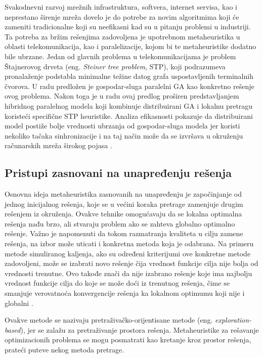 \documentclass[a4paper]{article}
\begin{document}
Svakodnevni razvoj mrežnih infrastruktura, softvera, internet servisa, kao i neprestano širenje mreža dovelo je do potrebe za novim algoritmima koji će zameniti tradicionalne koji su neefikasni kad su u pitanju problemi u industriji. Ta potreba za bržim rešenjima zadovoljena je upotrebnom metaheuristika u oblasti telekomunikacija, kao i paralelizacije, kojom bi te metaheuristike dodatno bile ubrzane. Jedan od glavnih problema u telekomunikacijama je problem Štajnerovog drveta (eng. \textit{Steiner tree problem}, STP), koji podrazumeva pronalaženje podstabla minimalne težine datog grafa uspostavljenih terminalnih čvorova. U radu \cite{fatta} predložen je gospodar-sluga paralelni GA kao konkretno rešenje ovog problema. Nakon toga je u radu \cite{martins} ovaj predlog proširen predstavljanjem hibridnog paralelnog modela koji kombinuje distribuirani GA i lokalnu pretragu koristeći specifične STP heuristike. Analiza efikasnosti pokazuje da distribuirani model postiže bolje vrednosti ubrzanja od gospodar-sluga modela jer koristi nekoliko tačaka sinhronizacije i na taj način može da se izvršava u okruženju računarskih mreža širokog pojasa \cite{alba}.

\subsection{Pristupi zasnovani na unapređenju rešenja}
\label{sec:ParalelizacijaJednog}

Osnovna ideja metaheuristika zasnovanih na unapređenju je započinjanje od jednog inicijalnog rešenja, koje se u većini koraka pretrage zamenjuje drugim rešenjem iz okruženja. Ovakve tehnike omogućavaju da se lokalna optimalna rešenja nađu brzo, ali stvaraju problem ako se zahteva globalno optimalno rešenje. Važno je napomenuti da tokom razmatranja kvaliteta u cilju zamene rešenja, na izbor može uticati i konkretna metoda koja je odabrana.
Na primeru metode simuliranog kaljenja, ako su određeni kriterijumi ove konkretne metode zadovoljeni, može se izabrati novo rešenje čija vrednost funkcije cilja nije bolja od vrednosti trenutne. Ovo takođe znači da nije izabrano rešenje koje ima najbolju vrednost funkcije cilja do koje se može doći iz trenutnog rešenja, čime se smanjuje verovatnoća konvergencije rešenja ka lokalnom optimumu koji nije i globalni \cite{talbi}.

Ovakve metode se nazivaju pretraživačko-orijentisane metode (eng. \textit{exploration-based}), jer se zalažu za pretraživanje prostora rešenja.
Metaheuristike za rešavanje optimizacionih problema se mogu 
posmatrati kao kretanje kroz prostor rešenja, prateći puteve nekog metoda pretrage.
\end{document}
